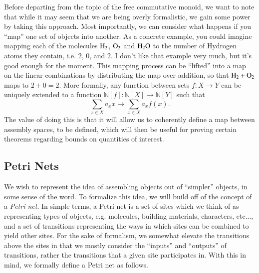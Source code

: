 \documentclass[aps,prd,onecolumn,nofootinbib,letterpaper,preprintnumbers,superscriptaddress,eqsecnum]{revtex4}
\theoremstyle{definition}
\newcommand{\N}{\mathbb{N}}
\newcommand{\red}[1]{{\color{red}#1}}
\begin{document}
Before departing from the topic of the free commutative monoid, we want to note that while it may seem that we are being overly formalistic, we gain some power by taking this approach.
Most importantly, we can consider what happens if you ``map'' one set of objects into another. 
As a concrete example, you could imagine mapping each of the molecules $\ce{H_2}$, $\ce{O_2}$ and $\ce{H_2O}$ to the number of Hydrogen atoms they contain, i.e. $2$, $0$, and $2$.
\red{I don't like that example very much, but it's good enough for the moment.}
This mapping process can be ``lifted'' into a map on the linear combinations by distributing the map over addition, so that $\ce{H_2} + \ce{O_2}$ maps to $2 + 0 = 2$. More formally, any function between sets $f : X \rightarrow Y$ can be uniquely extended to a function $\N[f] : \N[X] \rightarrow \N[Y]$ such that
\begin{equation*}
    \sum_{x \in X} a_x x \mapsto \sum_{x \in X} a_x f(x).
\end{equation*}
The value of doing this is that it will allow us to coherently define a map between assembly spaces, to be defined, which will then be useful for proving certain theorems regarding bounds on quantities of interest.

\subsection{Petri Nets}

We wish to represent the idea of assembling objects out of ``simpler'' objects, in some sense of the word.
To formalize this idea, we will build off of the concept of a \textit{Petri net}.
In simple terms, a Petri net is a set of sites which we think of as representing types of objects, e.g. molecules, building materials, characters, etc..., and a set of transitions representing the ways in which sites can be combined to yield other sites.
For the sake of formalism, we somewhat elevate the transitions above the sites in that we mostly consider the ``inputs'' and ``outputs'' of transitions, rather the transitions that a given site participates in.
With this in mind, we formally define a Petri net as follows.
\end{document}
